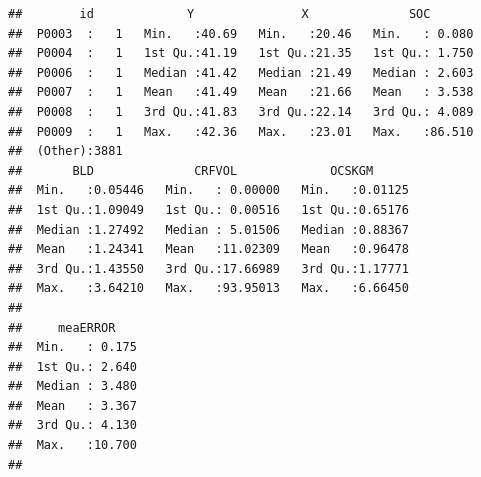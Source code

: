 \documentclass[10pt,b5paper,]{book}
\newenvironment{Shaded}{\begin{snugshade}}{\end{snugshade}}
\newcommand{\CommentTok}[1]{\textcolor[rgb]{0.56,0.35,0.01}{\textit{#1}}}
\newcommand{\DataTypeTok}[1]{\textcolor[rgb]{0.13,0.29,0.53}{#1}}
\newcommand{\DecValTok}[1]{\textcolor[rgb]{0.00,0.00,0.81}{#1}}
\newcommand{\KeywordTok}[1]{\textcolor[rgb]{0.13,0.29,0.53}{\textbf{#1}}}
\newcommand{\NormalTok}[1]{#1}
\newcommand{\OperatorTok}[1]{\textcolor[rgb]{0.81,0.36,0.00}{\textbf{#1}}}
\newcommand{\StringTok}[1]{\textcolor[rgb]{0.31,0.60,0.02}{#1}}
\theoremstyle{definition}
\theoremstyle{definition}
\theoremstyle{definition}
\theoremstyle{remark}
\begin{document}
\begin{Shaded}
\end{Shaded}

\begin{verbatim}
##        id             Y               X              SOC        
##  P0003  :   1   Min.   :40.69   Min.   :20.46   Min.   : 0.080  
##  P0004  :   1   1st Qu.:41.19   1st Qu.:21.35   1st Qu.: 1.750  
##  P0006  :   1   Median :41.42   Median :21.49   Median : 2.603  
##  P0007  :   1   Mean   :41.49   Mean   :21.66   Mean   : 3.538  
##  P0008  :   1   3rd Qu.:41.83   3rd Qu.:22.14   3rd Qu.: 4.089  
##  P0009  :   1   Max.   :42.36   Max.   :23.01   Max.   :86.510  
##  (Other):3881                                                   
##       BLD              CRFVOL             OCSKGM       
##  Min.   :0.05446   Min.   : 0.00000   Min.   :0.01125  
##  1st Qu.:1.09049   1st Qu.: 0.00516   1st Qu.:0.65176  
##  Median :1.27492   Median : 5.01506   Median :0.88367  
##  Mean   :1.24341   Mean   :11.02309   Mean   :0.96478  
##  3rd Qu.:1.43550   3rd Qu.:17.66989   3rd Qu.:1.17771  
##  Max.   :3.64210   Max.   :93.95013   Max.   :6.66450  
##                                                        
##     meaERROR     
##  Min.   : 0.175  
##  1st Qu.: 2.640  
##  Median : 3.480  
##  Mean   : 3.367  
##  3rd Qu.: 4.130  
##  Max.   :10.700  
## 
\end{verbatim}
\end{document}
